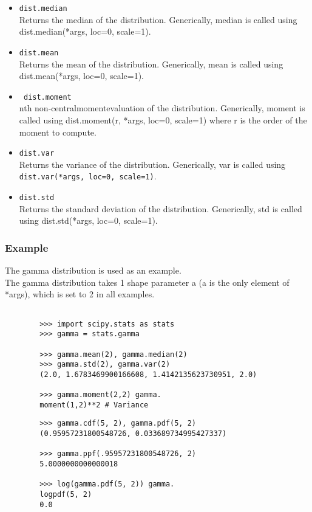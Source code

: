 \documentclass[MASTER.tex]{subfiles}
\begin{document}
\begin{frame}
	\begin{itemize}
		\item \texttt{dist.median}\\
		Returns the median of the distribution. Generically, median is called using dist.median(*args, loc=0, scale=1).
		\item \texttt{dist.mean}\\
		Returns the mean of the distribution. Generically, mean is called using dist.mean(*args, loc=0, scale=1).
		\item\texttt{ dist.moment}\\
		nth non-centralmomentevaluation of the distribution. Generically, moment is called using dist.moment(r, *args,
		loc=0, scale=1) where r is the order of the moment to compute.
		\item \texttt{dist.var}\\
		Returns the variance of the distribution. Generically, var is called using \texttt{dist.var(*args, loc=0, scale=1)}.
		\item \texttt{dist.std}\\
		Returns the standard deviation of the distribution. Generically, std is called using dist.std(*args, loc=0, scale=1).
	\end{itemize}
\end{frame}
\begin{frame}[fragile]
	\frametitle{Example}
	The gamma distribution is used as an example. \\ The gamma distribution takes 1 shape parameter a (a is
	the only element of *args), which is set to 2 in all examples.
	\begin{framed}
		\begin{verbatim}
			
		>>> import scipy.stats as stats
		>>> gamma = stats.gamma
		
		>>> gamma.mean(2), gamma.median(2)
		>>> gamma.std(2), gamma.var(2)
		(2.0, 1.6783469900166608, 1.4142135623730951, 2.0)
		
		>>> gamma.moment(2,2) gamma.
		moment(1,2)**2 # Variance
		\end{verbatim}
	\end{framed}
\end{frame}
\begin{frame}[fragile]	
	\begin{framed}
		\begin{verbatim}
		>>> gamma.cdf(5, 2), gamma.pdf(5, 2)
		(0.95957231800548726, 0.033689734995427337)
		
		>>> gamma.ppf(.95957231800548726, 2)
		5.0000000000000018
		
		>>> log(gamma.pdf(5, 2)) gamma.
		logpdf(5, 2)
		0.0
		\end{verbatim}
	\end{framed}
\end{frame}
\end{document}
